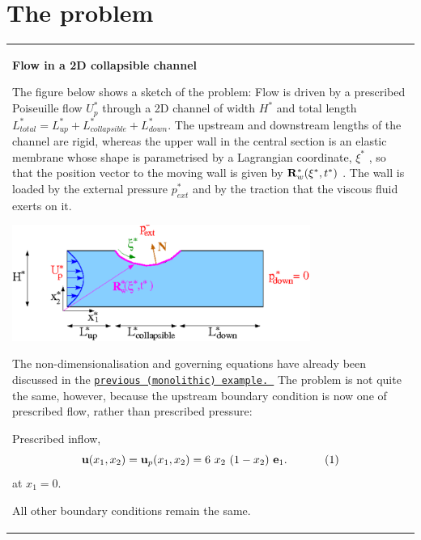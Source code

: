 \hypertarget{index_problem}{}\section{The problem}\label{index_problem}
\begin{center} \tabulinesep=1mm
\begin{longtabu} spread 0pt [c]{*{1}{|X[-1]}|}
\hline
\begin{center} {\bfseries Flow in a 2D collapsible channel } \end{center} 

The figure below shows a sketch of the problem\+: Flow is driven by a prescribed Poiseuille flow $U^{*}_{p}$ through a 2D channel of width $ H^* $ and total length $ L^*_{total} = L^*_{up} + L^*_{collapsible} + L^*_{down}. $ The upstream and downstream lengths of the channel are rigid, whereas the upper wall in the central section is an elastic membrane whose shape is parametrised by a Lagrangian coordinate, $ \xi^* $ , so that the position vector to the moving wall is given by $ {\bf R}_w^*(\xi^*,t^*) $ . The wall is loaded by the external pressure $ p_{ext}^* $ and by the traction that the viscous fluid exerts on it.

 
\begin{DoxyImage}
\includegraphics[width=0.75\textwidth]{collapsible_channel_sketch}
\end{DoxyImage}


The non-\/dimensionalisation and governing equations have already been discussed in the \href{../../fsi_collapsible_channel/html/index.html}{\tt previous (monolithic) example. } The problem is not quite the same, however, because the upstream boundary condition is now one of prescribed flow, rather than prescribed pressure\+:
\begin{DoxyItemize}
\item Prescribed inflow, \[ {\bf u}(x_1,x_2) = {\bf u}_{p}(x_1,x_2) = 6 \ x_2 \ (1-x_2) \ {\bf e}_1. \ \ \ \ \ \ \ \ \ \ (1) \] at $ x_{1}=0$.
\end{DoxyItemize}All other boundary conditions remain the same.

\\
\end{longtabu}
\end{center} 




